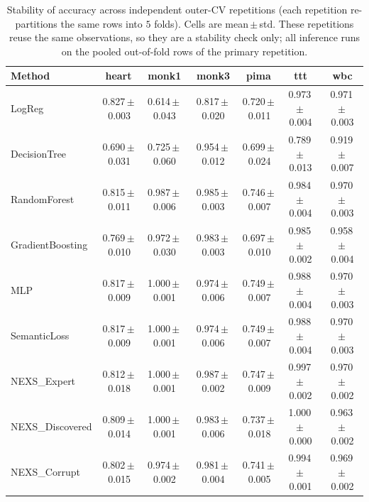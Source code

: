 \begin{table}[t]\centering
\footnotesize
\caption{Stability of accuracy across independent outer-CV repetitions (each repetition re-partitions the same rows into $5$ folds). Cells are mean\,$\pm$\,std. These repetitions reuse the same observations, so they are a stability check only; all inference runs on the pooled out-of-fold rows of the primary repetition.}
\label{tab:nested-seed}
\begin{tabular}{lcccccc}
\toprule
Method & heart & monk1 & monk3 & pima & ttt & wbc \\
\midrule
LogReg & 0.827\,$\pm$\,0.003 & 0.614\,$\pm$\,0.043 & 0.817\,$\pm$\,0.020 & 0.720\,$\pm$\,0.011 & 0.973\,$\pm$\,0.004 & 0.971\,$\pm$\,0.003 \\
DecisionTree & 0.690\,$\pm$\,0.031 & 0.725\,$\pm$\,0.060 & 0.954\,$\pm$\,0.012 & 0.699\,$\pm$\,0.024 & 0.789\,$\pm$\,0.013 & 0.919\,$\pm$\,0.007 \\
RandomForest & 0.815\,$\pm$\,0.011 & 0.987\,$\pm$\,0.006 & 0.985\,$\pm$\,0.003 & 0.746\,$\pm$\,0.007 & 0.984\,$\pm$\,0.004 & 0.970\,$\pm$\,0.003 \\
GradientBoosting & 0.769\,$\pm$\,0.010 & 0.972\,$\pm$\,0.030 & 0.983\,$\pm$\,0.003 & 0.697\,$\pm$\,0.010 & 0.985\,$\pm$\,0.002 & 0.958\,$\pm$\,0.004 \\
MLP & 0.817\,$\pm$\,0.009 & 1.000\,$\pm$\,0.001 & 0.974\,$\pm$\,0.006 & 0.749\,$\pm$\,0.007 & 0.988\,$\pm$\,0.004 & 0.970\,$\pm$\,0.003 \\
SemanticLoss & 0.817\,$\pm$\,0.009 & 1.000\,$\pm$\,0.001 & 0.974\,$\pm$\,0.006 & 0.749\,$\pm$\,0.007 & 0.988\,$\pm$\,0.004 & 0.970\,$\pm$\,0.003 \\
NEXS\_Expert & 0.812\,$\pm$\,0.018 & 1.000\,$\pm$\,0.001 & 0.987\,$\pm$\,0.002 & 0.747\,$\pm$\,0.009 & 0.997\,$\pm$\,0.002 & 0.970\,$\pm$\,0.002 \\
NEXS\_Discovered & 0.809\,$\pm$\,0.014 & 1.000\,$\pm$\,0.001 & 0.983\,$\pm$\,0.006 & 0.737\,$\pm$\,0.018 & 1.000\,$\pm$\,0.000 & 0.963\,$\pm$\,0.002 \\
NEXS\_Corrupt & 0.802\,$\pm$\,0.015 & 0.974\,$\pm$\,0.002 & 0.981\,$\pm$\,0.004 & 0.741\,$\pm$\,0.005 & 0.994\,$\pm$\,0.001 & 0.969\,$\pm$\,0.002 \\
\bottomrule
\end{tabular}
\end{table}